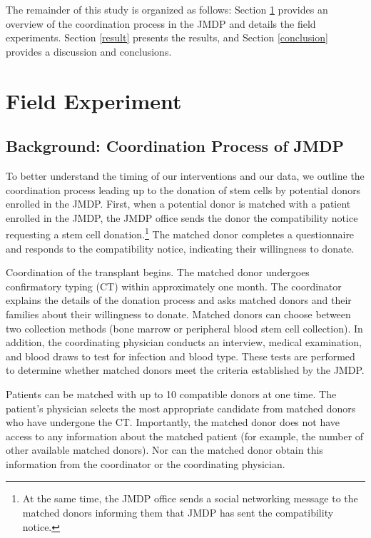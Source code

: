 \documentclass[12pt, a4paper]{article}
\begin{document}
The remainder of this study is organized as follows: Section \ref{experiment} provides an overview of the coordination process in the JMDP and details the field experiments. Section \ref{result} presents the results, and Section \ref{conclusion} provides a discussion and conclusions.

\hypertarget{experiment}{%
\section{Field Experiment}\label{experiment}}

\hypertarget{background}{%
\subsection{Background: Coordination Process of JMDP}\label{background}}

To better understand the timing of our interventions and our data, we outline the coordination process leading up to the donation of stem cells by potential donors enrolled in the JMDP. First, when a potential donor is matched with a patient enrolled in the JMDP, the JMDP office sends the donor the compatibility notice requesting a stem cell donation.\footnote{At the same time, the JMDP office sends a social networking message to the matched donors informing them that JMDP has sent the compatibility notice.} The matched donor completes a questionnaire and responds to the compatibility notice, indicating their willingness to donate.

Coordination of the transplant begins. The matched donor undergoes confirmatory typing (CT) within approximately one month. The coordinator explains the details of the donation process and asks matched donors and their families about their willingness to donate. Matched donors can choose between two collection methods (bone marrow or peripheral blood stem cell collection). In addition, the coordinating physician conducts an interview, medical examination, and blood draws to test for infection and blood type. These tests are performed to determine whether matched donors meet the criteria established by the JMDP.

Patients can be matched with up to 10 compatible donors at one time. The patient's physician selects the most appropriate candidate from matched donors who have undergone the CT. Importantly, the matched donor does not have access to any information about the matched patient (for example, the number of other available matched donors). Nor can the matched donor obtain this information from the coordinator or the coordinating physician.
\end{document}
